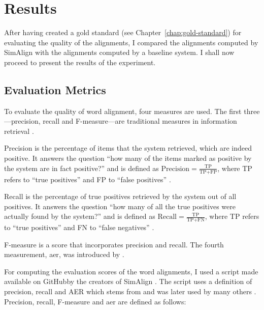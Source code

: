 \chapter{Results}

After having created a gold standard (see Chapter~\ref{chap:gold-standard}) for evaluating the quality of the alignments, I compared the alignments computed by SimAlign with the alignments computed by a baseline system.
I shall now proceed to present the results of the experiment.

\section{Evaluation Metrics}
\label{sec:evaluation-metrics}
To evaluate the quality of word alignment, four measures are used. 
The first three---precision, recall and F-measure---are traditional measures in information retrieval \autocite{mihalcea-pedersen-2003-evaluation}.

Precision is the percentage of items that the system retrieved, which are indeed positive.
It answers the question \enquote{how many of the items marked as positive by the system are in fact positive?} and is defined as $\text{Precision}=\frac{\text{TP}}{\text{TP}+\text{FP}}$, where TP refers to \enquote{true positives} and FP to \enquote{false positives} \autocite[67]{jurafsky-2019}.

Recall is the percentage of true positives retrieved by the system out of all positives.
It answers the question \enquote{how many of all the true positives were actually found by the system?} and is defined as $\text{Recall}=\frac{\text{TP}}{\text{TP}+\text{FN}}$, where TP refers to \enquote{true positives} and FN to \enquote{false negatives} \autocite[67]{jurafsky-2019}.

F-measure is a score that incorporates precision and recall. 
The fourth measurement, \acrfull{aer}, was introduced by \cite{och-ney-2000-improved}. 

For computing the evaluation scores of the word alignments, I used a script made available on GitHub\footnotemark by the creators of SimAlign \autocite{jalili-sabet-etal-2020-simalign}. 
The script uses a definition of precision, recall and AER which stems from \cite{och-ney-2000-improved} and was later used by many others \autocites{mihalcea-pedersen-2003-evaluation,och-ney-2003-systematic,Ostling2016efmaral,jalili-sabet-etal-2020-simalign}. Precision, recall, F-measure and \acrshort{aer} are defined as follows:

